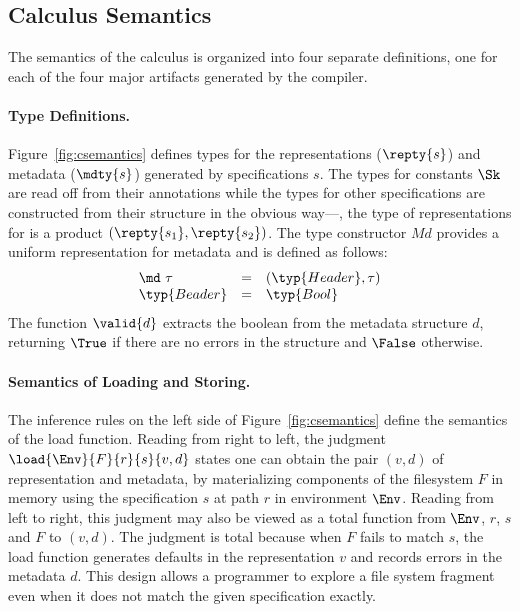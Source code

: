 \subsection{Calculus Semantics}
%
The semantics of the calculus is organized into four separate
definitions, one for each of the four major artifacts generated by the
\forest{} compiler.

\paragraph*{Type Definitions.}
Figure~\ref{fig:csemantics} defines types for the representations
($\repty{s}$) and metadata ($\mdty{s}$) generated by specifications
$s$. The types for constants $\Sk$ are read off from their annotations
while the types for other specifications are constructed from their
structure in the obvious way---\eg, the type of representations for
 is a product $(\repty{s_1}, \repty{s_2})$. The
type constructor $\mathit{Md}$ provides a uniform representation for
metadata and is defined as follows:
\[
\begin{array}{lcl}
\md~{\tau} & = & (\typ{Header}, \tau) \\
\typ{Beader} & = & \typ{Bool} 
\end{array}
\]
The function $\valid{d}$ extracts the boolean from the metadata
structure $d$, returning $\True$ if there are no errors in the
structure and $\False$ otherwise. 

\paragraph*{Semantics of Loading and Storing.}
The inference rules on the left side of
Figure~\ref{fig:csemantics} define the semantics of the load
function. Reading from right to left, the judgment 
$\load{\Env}{F}{r}{s}{v,d}$ states one can obtain the pair $(v,d)$ of
representation and metadata, by materializing components
of the filesystem $F$ in memory using the specification $s$
at path $r$ in environment $\Env$.  Reading from
left to right, this judgment may also be viewed
as a total function from $\Env$, $r$, $s$ and $F$ to $(v,d)$. The
judgment is total because when $F$ fails to match $s$, the load
function generates defaults in the representation $v$ and records
errors in the metadata $d$.  This design allows a programmer to
explore a file system fragment even when it does not match the
given specification exactly.

